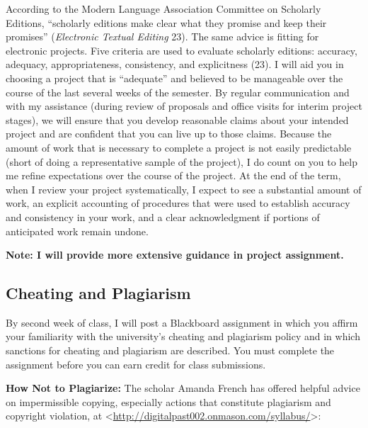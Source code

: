 \documentclass[]{article}
\begin{document}
According to the Modern Language Association Committee on Scholarly
Editions, ``scholarly editions make clear what they promise and keep
their promises'' (\emph{Electronic Textual Editing} 23). The same advice
is fitting for electronic projects. Five criteria are used to evaluate
scholarly editions: accuracy, adequacy, appropriateness, consistency,
and explicitness (23). I will aid you in choosing a project that is
``adequate'' and believed to be manageable over the course of the last
several weeks of the semester. By regular communication and with my
assistance (during review of proposals and office visits for interim
project stages), we will ensure that you develop reasonable claims about
your intended project and are confident that you can live up to those
claims. Because the amount of work that is necessary to complete a
project is not easily predictable (short of doing a representative
sample of the project), I do count on you to help me refine expectations
over the course of the project. At the end of the term, when I review
your project systematically, I expect to see a substantial amount of
work, an explicit accounting of procedures that were used to establish
accuracy and consistency in your work, and a clear acknowledgment if
portions of anticipated work remain undone.

\textbf{Note: I will provide more extensive guidance in project
assignment.}

\subsection{Cheating and Plagiarism}\label{cheating-and-plagiarism}

By second week of class, I will post a Blackboard assignment in which
you affirm your familiarity with the university's cheating and
plagiarism policy and in which sanctions for cheating and plagiarism are
described. You must complete the assignment before you can earn credit
for class submissions.

\textbf{How Not to Plagiarize:} The scholar Amanda French has offered
helpful advice on impermissible copying, especially actions that
constitute plagiarism and copyright violation, at
\textless{}\url{http://digitalpast002.onmason.com/syllabus/}\textgreater{}:
\end{document}
